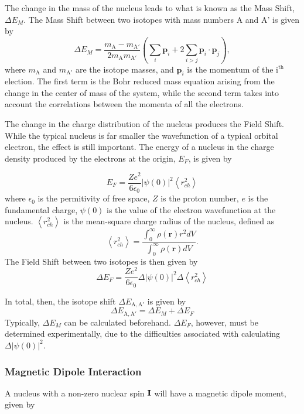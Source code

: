 The change in the mass of the nucleus leads to what is known as the Mass Shift, $\Delta E_M$. The Mass Shift between two isotopes with mass numbers A and A' is given by\citep{TomT}
\begin{equation}
\Delta E_M = \frac{m_{\mathrm{A}}-m_{\mathrm{A'}}}{2 m_{\mathrm{A}} m_{\mathrm{A'}}} \left(\sum_i\mathrm{\textbf{p}}_i +2 \sum_{i>j}\mathrm{\textbf{p}}_i \cdot \mathrm{\textbf{p}}_j \right),
\end{equation}
where $m_{\mathrm{A}}$ and $m_{\mathrm{A'}}$ are the isotope masses, and $\textbf{p}_i$ is the momentum of the i$^{\mathrm{th}}$ election. The first term is the Bohr reduced mass equation arising from the change in the center of mass of the system, while the second term takes into account the correlations between the momenta of all the electrons. 

The change in the charge distribution of the nucleus produces the Field Shift. While the typical nucleus is far smaller the wavefunction of a typical orbital electron, the effect is still important. The energy of a nucleus in the charge density produced by the electrons at the origin, $E_F$, is given by

\begin{equation}
E_F = \frac{Ze^2}{6 \epsilon_0}|\psi(0)|^2 \left\langle r_{ch}^2\right\rangle
\end{equation}
where $\epsilon_0$ is the permitivity of free space, $Z$ is the proton number, $e$ is the fundamental charge, $\psi(0)$ is the value of the electron wavefunction at the nucleus. $ \left\langle r_{ch}^2\right\rangle$ is the mean-square charge radius of the nucleus, defined as \cite{LasCool}
\begin{equation}
 \left\langle r_{ch}^2\right\rangle = \frac{\int_0^{\infty}\rho(\mathbf{r})r^2dV}{\int_0^{\infty}\rho(\mathbf{r})dV}.
\end{equation}
\noindent The Field Shift between two isotopes is then given by
\begin{equation}
\Delta E_F =  \frac{Ze^2}{6 \epsilon_0}\Delta|\psi(0)|^2 \Delta\left\langle r_{ch}^2\right\rangle
\end{equation}

\noindent In total, then, the isotope shift $\Delta E_{\mathrm{A,A}'}$ is given by
\begin{equation}
 \Delta E_{\mathrm{A,A'}} = \Delta E_M + \Delta E_F
\end{equation}
\noindent Typically, $\Delta E_M$ can be calculated beforehand. $ \Delta E_F$, however, must be determined experimentally, due to the difficulties associated with calculating $\Delta|\psi(0)|^2$.
\noindent \subsubsection{Magnetic Dipole Interaction}
A nucleus with a non-zero nuclear spin $\bf{I}$  will have a magnetic dipole moment, given by

